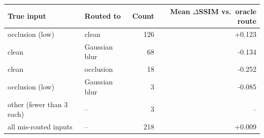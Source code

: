 \begin{tabular}{llrr}
\toprule
True input & Routed to & Count & Mean $\Delta$SSIM vs.\ oracle route \\
\midrule
occlusion (low) & clean & 126 & +0.123 \\
clean & Gaussian blur & 68 & -0.134 \\
clean & occlusion & 18 & -0.252 \\
occlusion (low) & Gaussian blur & 3 & -0.085 \\
other (fewer than 3 each) & -- & 3 & -- \\
\midrule
all mis-routed inputs & -- & 218 & +0.009 \\
\bottomrule
\end{tabular}
